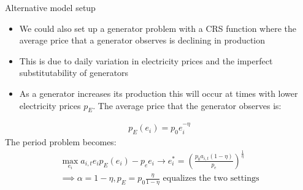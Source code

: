 \documentclass{beamer}
\begin{document}
\begin{frame}{Alternative model setup}\label{alt_model}
\small 
\begin{itemize}
    \item We could also set up a generator problem with a CRS function where the average price that a generator observes is declining in production
    \item This is due to daily variation in electricity prices and the imperfect substitutability of generators
    \item As a generator increases its production this will occur at times with lower electricity prices $p_E$. The average price that the generator observes is:
\end{itemize}   
    \small\begin{align*}
        p_E(e_i) = p_0e_i^{-\eta}
    \end{align*}
    \small The period problem becomes:
    \small\begin{align*}
        \max_{e_i} a_{i,t}e_ip_E(e_i) - p_ee_i \rightarrow e_i^* = (\frac{p_0a_{i,t}(1-\eta)}{p_e})^\frac{1}{\eta} \\\implies \alpha = 1-\eta , p_E = p_0\frac{\eta}{1-\eta} \text{ equalizes the two settings}
    \end{align*}
    \hyperlink{gen_problem}{}   
\end{frame}


\end{document}
